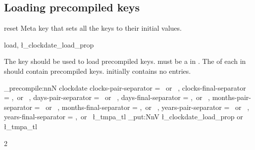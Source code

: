 \documentclass{beerydoc}
\begin{document}
\subsection{Loading precompiled keys}
\label{subsec:loadkeys}

\begin{codedoc}{reset}
  Meta key that sets all the  keys to their initial values.
\end{codedoc}

\begin{codedoc}{load, \l_clockdate_load_prop}
  \begin{syntax}
  \end{syntax}
  The key  should be used to load precompiled  keys.
   must be a  in .
  The  of each  in  should
  contain precompiled  keys.
   initially contains no entries.
  \begin{codedemo}
    \ExplSyntaxOn
    \keys_precompile:nnN { clockdate }
      {
          clocks-pair-separator  = {  ~or~ }
        , clocks-final-separator = { ,~or~ }
        , days-pair-separator    = {  ~or~ }
        , days-final-separator   = { ,~or~ }
        , months-pair-separator  = {  ~or~ }
        , months-final-separator = { ,~or~ }
        , years-pair-separator   = {  ~or~ }
        , years-final-separator  = { ,~or~ }
      }
      \l_tmpa_tl
    \prop_put:NnV \l_clockdate_load_prop { or } \l_tmpa_tl
    \ExplSyntaxOff
    \begin{multicols}{2}
      \\
      \\
      \\
      \\
      \\
      \\
      \\
      \\
      \\
      \\
      \\
      \\
      \\
      \\
      \\
    \end{multicols}
  \end{codedemo}
\end{codedoc}
\end{document}
